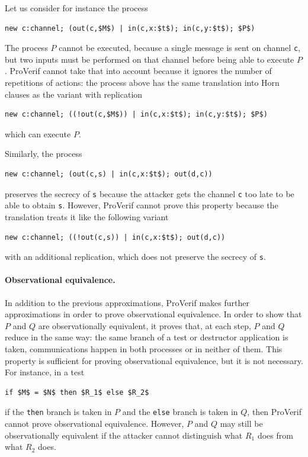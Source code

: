 \documentclass{book}
\begin{document}
Let us consider for instance the process
\begin{lstlisting}[numbers=none]
  new c:channel; (out(c,$M$) | in(c,x:$t$); in(c,y:$t$); $P$)
\end{lstlisting}
The process $P$ cannot be executed, because a single message is
sent on channel \lstinline!c!, but two inputs must be performed
on that channel before being able to execute $P$. ProVerif cannot
take that into account because it ignores the number of repetitions of
actions: the process above has the same translation into Horn clauses
as the variant with replication
\begin{lstlisting}[numbers=none]
  new c:channel; ((!out(c,$M$)) | in(c,x:$t$); in(c,y:$t$); $P$)
\end{lstlisting}
which can execute $P$.

Similarly, the process
\begin{lstlisting}[numbers=none]
  new c:channel; (out(c,s) | in(c,x:$t$); out(d,c))
\end{lstlisting}
preserves the secrecy of \lstinline!s! because the attacker gets the
channel \lstinline!c! too late to be able to obtain \lstinline!s!.
However, ProVerif cannot prove this property because the translation
treats it like the following variant
\begin{lstlisting}[numbers=none]
  new c:channel; ((!out(c,s)) | in(c,x:$t$); out(d,c))
\end{lstlisting}
with an additional replication, which does not preserve the secrecy of
\lstinline!s!.

\paragraph{Observational equivalence.}

In addition to the previous approximations, ProVerif makes further
approximations in order to prove observational equivalence. In order
to show that $P$ and $Q$ are observationally equivalent, it proves
that, at each step, $P$ and $Q$ reduce in the same way: the same
branch of a test or destructor application is taken, communications
happen in both processes or in neither of them. This property is
sufficient for proving observational equivalence, but it is not
necessary. For instance, in a test
%
\begin{lstlisting}[numbers=none]
  if $M$ = $N$ then $R_1$ else $R_2$
\end{lstlisting}
%
if the \lstinline!then! branch is taken in $P$ and the
\lstinline!else! branch is taken in $Q$, then ProVerif cannot prove
observational equivalence. However, $P$ and $Q$ may still be
observationally equivalent if the attacker cannot distinguish what
$R_1$ does from what $R_2$ does.
\end{document}
